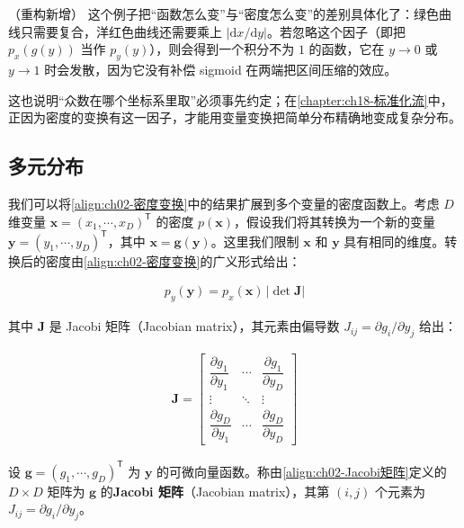 \documentclass[../../main.tex]{subfiles}
\begin{document}
\begin{remark}（重构新增）
这个例子把“函数怎么变”与“密度怎么变”的差别具体化了：绿色曲线只需要复合，洋红色曲线还需要乘上 $|\mathrm{d}x/\mathrm{d}y|$。若忽略这个因子（即把 $p_x(g(y))$ 当作 $p_y(y)$），则会得到一个积分不为 $1$ 的函数，它在 $y\to0$ 或 $y\to1$ 时会发散，因为它没有补偿 sigmoid 在两端把区间压缩的效应。

这也说明“众数在哪个坐标系里取”必须事先约定；在\cref{chapter:ch18-标准化流}中，正因为密度的变换有这一因子，才能用变量变换把简单分布精确地变成复杂分布。
\end{remark}

\subsection*{多元分布}

我们可以将\eqref{align:ch02-密度变换}中的结果扩展到多个变量的密度函数上。考虑 $D$ 维变量 $\mathbf{x}=(x_1,\cdots,x_D)^{\mathsf{T}}$ 的密度 $p(\mathbf{x})$，假设我们将其转换为一个新的变量 $\mathbf{y}=(y_1,\cdots,y_D)^{\mathsf{T}}$，其中 $\mathbf{x}=\mathbf{g}(\mathbf{y})$。这里我们限制 $\mathbf{x}$ 和 $\mathbf{y}$ 具有相同的维度。转换后的密度由\eqref{align:ch02-密度变换}的广义形式给出：

\begin{align}
  p_y(\mathbf{y}) = p_x(\mathbf{x})\,\big|\det\mathbf{J}\big|
  \label{align:ch02-多元密度变换}
\end{align}

其中 $\mathbf{J}$ 是 Jacobi 矩阵（Jacobian matrix），其元素由偏导数 $J_{ij}=\partial g_i/\partial y_j$ 给出：

\begin{align}
  \mathbf{J} =
  \begin{bmatrix}
    \dfrac{\partial g_1}{\partial y_1} & \cdots & \dfrac{\partial g_1}{\partial y_D} \\
    \vdots & \ddots & \vdots \\
    \dfrac{\partial g_D}{\partial y_1} & \cdots & \dfrac{\partial g_D}{\partial y_D}
  \end{bmatrix}
  \label{align:ch02-Jacobi矩阵}
\end{align}

\begin{definition}[Jacobi 矩阵]\label{definition:ch02-Jacobi矩阵}
设 $\mathbf{g}=(g_1,\cdots,g_D)^{\mathsf{T}}$ 为 $\mathbf{y}$ 的可微向量函数。称由\eqref{align:ch02-Jacobi矩阵}定义的 $D\times D$ 矩阵为 $\mathbf{g}$ 的\textbf{Jacobi 矩阵}（Jacobian matrix），其第 $(i,j)$ 个元素为 $J_{ij}=\partial g_i/\partial y_j$。
\end{definition}
\end{document}
